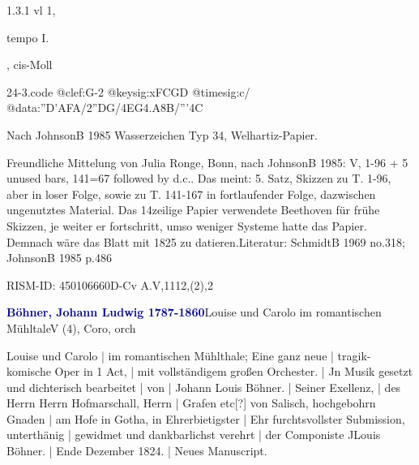 \documentclass[a4paper, twocolumn, 11pt]{book}
\begin{document}
\newline %
\par 1.3.1  vl 1, \begin{itshape}tempo I.\end{itshape}, cis-Moll  
\begin{filecontents*}{24-3.code}
@clef:G-2
@keysig:xFCGD
@timesig:c/
@data:''D'AFA/2''DG/4EG4.A8B/'''4C
\end{filecontents*}

\newline %
\par Nach JohnsonB 1985 Wasserzeichen Typ 34, Welhartiz-Papier.
\par Freundliche Mittelung von Julia Ronge, Bonn, nach JohnsonB 1985: {\textquotedbl}V, 1-96 + 5 unused bars, 141=67 followed by d.c.{\textquotedbl}. Das meint: 5. Satz, Skizzen zu T. 1-96, aber in loser Folge, sowie zu T. 141-167 in fortlaufender Folge, dazwischen ungenutztes Material. Das 14zeilige Papier verwendete Beethoven für frühe Skizzen, je weiter er fortschritt, umso weniger Systeme hatte das Papier. Demnach wäre das Blatt mit 1825 zu datieren.\newline Literatur: SchmidtB 1969  no.318; JohnsonB 1985  p.486
\par RISM-ID: 450106660\newline D-Cv  A.V,1112,(2),2
\par \vspace{16pt} \textcolor{darkblue}{\textbf{Böhner, Johann Ludwig  1787-1860}}\hfillplus{[25]}\newline Louise und Carolo im romantischen Mühltale\newline V (4), Coro, orch
\par \begin{itshape} Louise und Carolo | im romantischen Mühlthale; Eine ganz neue | tragik-komische Oper in 1 Act, | mit vollständigem großen Orchester. | Jn Musik gesetzt und dichterisch bearbeitet | von | Johann Louis Böhner. | Seiner Exellenz, | des Herrn Herrn Hofmarschall, Herrn | Grafen etc[?] von Salisch, hochgebohrn Gnaden | am Hofe in Gotha, in Ehrerbietigster | Ehr furchtsvollster Submission, unterthänig | gewidmet und dankbarlichst verehrt | der Componiste JLouis Böhner. | Ende Dezember 1824. | Neues Manuscript.\end{itshape} 
\end{document}
